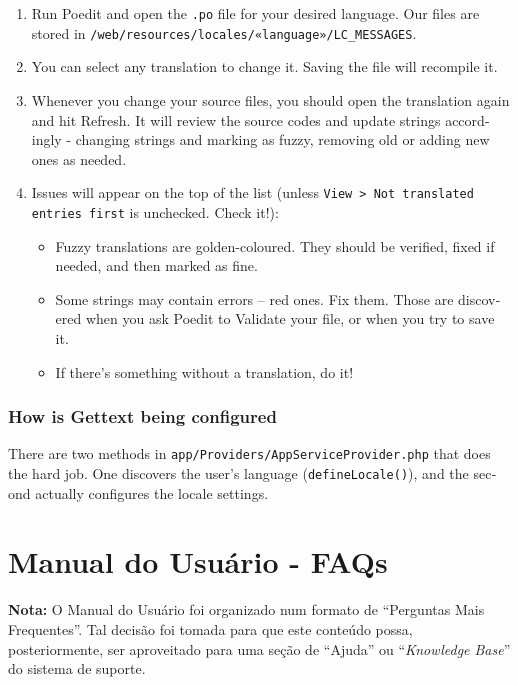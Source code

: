 \documentclass[12pt,a4paper,twoside,hyphens,english,brazil]{abntex2}
\begin{document}
{\begin{otherlanguage}{english}
\begin{enumerate}
	\item Run Poedit and open the \texttt{.po} file for your desired language. Our files are stored in \texttt{/web/resources/locales/«language»/LC\_MESSAGES}.
	\item You can select any translation to change it. Saving the file will recompile it.
	\item Whenever you change your source files, you should open the translation again and hit Refresh. It will review the source codes and update strings accordingly - changing strings and marking as fuzzy, removing old or adding new ones as needed.
	\item Issues will appear on the top of the list (unless \texttt{View > Not translated entries first} is unchecked. Check it!):
		\begin{itemize}
			\item Fuzzy translations are golden-coloured. They should be verified, fixed if needed, and then marked as fine.
			\item Some strings may contain errors -- red ones. Fix them. Those are discovered when you ask Poedit to Validate your file, or when you try to save it.
			\item If there's something without a translation, do it!
   		\end{itemize}
\end{enumerate}

\subsection{How is Gettext being configured}
There are two methods in \texttt{app/Providers/AppServiceProvider.php} that does the hard job. One discovers the user's language (\texttt{defineLocale()}), and the second actually configures the locale settings.

\end{otherlanguage}

\chapter{Manual do Usuário - FAQs} \label{apend:usuario}
\renewcommand{\subsectionautorefname}{FAQ}

\begin{framed}
	\noindent
	\textbf{Nota:} O Manual do Usuário foi organizado num formato de ``Perguntas Mais Frequentes''. Tal decisão foi tomada para que este conteúdo possa, posteriormente, ser aproveitado para uma seção de ``Ajuda'' ou ``\emph{Knowledge Base}'' do sistema de suporte.
	

\end{framed}}
\end{document}
